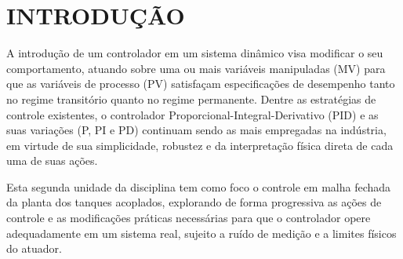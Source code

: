\documentclass[a4paper,12pt]{article}
\begin{document}

\thispagestyle{empty}

\begin{center}
\listoffigures
\end{center}

\newpage


\thispagestyle{empty}

\begin{center}
\listoftables
\end{center}

\newpage


\thispagestyle{empty}

\begin{center}
\tableofcontents
\end{center}

\newpage


\thispagestyle{main}

\section{INTRODUÇÃO}

\begin{justify}
    \hspace{4ex}A introdução de um controlador em um sistema dinâmico visa modificar o seu comportamento, atuando sobre uma ou mais variáveis manipuladas (MV) para que as variáveis de processo (PV) satisfaçam especificações de desempenho tanto no regime transitório quanto no regime permanente. Dentre as estratégias de controle existentes, o controlador Proporcional-Integral-Derivativo (PID) e as suas variações (P, PI e PD) continuam sendo as mais empregadas na indústria, em virtude de sua simplicidade, robustez e da interpretação física direta de cada uma de suas ações.
\end{justify}

\begin{justify}
    \hspace{4ex}Esta segunda unidade da disciplina tem como foco o controle em malha fechada da planta dos tanques acoplados, explorando de forma progressiva as ações de controle e as modificações práticas necessárias para que o controlador opere adequadamente em um sistema real, sujeito a ruído de medição e a limites físicos do atuador.
\end{justify}
\end{document}
